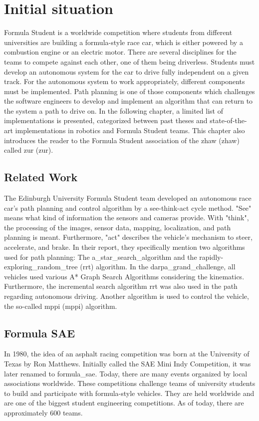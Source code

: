 \section{Initial situation} \label{sec:Initial situation}
Formula Student is a worldwide competition where students from different universities are building a formula-style race car, which is either powered by a combustion engine or an electric motor. There are several disciplines for the teams to compete against each other, one of them being \Gls{driverless}. Students must develop an autonomous system for the car to drive fully independent on a given track. For the autonomous system to work appropriately, different components must be implemented. Path planning is one of those components which challenges the software engineers to develop and implement an algorithm that can return to the system a path to drive on. In the following chapter, a limited list of implementations is presented, categorized between past theses and state-of-the-art implementations in robotics and Formula Student teams. This chapter also introduces the reader to the Formula Student association of the \acrlong{zhaw} (\acrshort{zhaw}) called \acrlong{zur} (\acrshort{zur}).

\subsection{Related Work} \label{sec:Related Work}
The Edinburgh University Formula Student team developed an autonomous race car's path planning and control algorithm by a see-think-act cycle method. "See" means what kind of information the sensors and cameras provide. With "think", the processing of the images, sensor data, mapping, localization, and path planning is meant. Furthermore, "act" describes the vehicle's mechanism to steer, accelerate, and brake. \cite{path_planning_and_control_georgiev}
In their report, they specifically mention two algorithms used for path planning: The \Gls{a_star_search_algorithm} and the \Gls{rapidly-exploring_random_tree} (\acrshort{rrt}) algorithm. In the \Gls{darpa_grand_challenge}, all vehicles used various A* Graph Search Algorithms considering the kinematics. Furthermore, the incremental search algorithm \acrshort{rrt} was also used in the path regarding autonomous driving. \cite{darpa_grand_challenge}
Another algorithm is used to control the vehicle, the so-called \acrlong{mppi} (\acrshort{mppi}) algorithm. \cite{model_predictive_path_integration}

\subsection{Formula SAE}
In 1980, the idea of an asphalt racing competition was born at the University of Texas by Ron Matthews. Initially called the SAE Mini Indy Competition, it was later renamed to \Gls{formula_sae}. Today, there are many events organized by local associations worldwide. \cite{formula_sae}
These competitions challenge teams of university students to build and participate with formula-style vehicles. They are held worldwide and are one of the biggest student engineering competitions. As of today, there are approximately 600 teams. \cite{sae_student_events}


